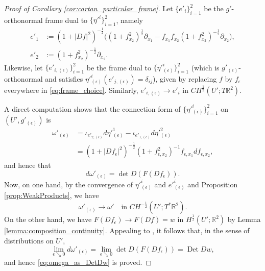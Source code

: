 \documentclass[12pt]{article}
\newcommand{\R}{\mathbb{R}}
\newcommand{\Det}{\operatorname{Det}}
\theoremstyle{plain}
\numberwithin{equation}{section}
\begin{document}
\begin{proof}[{Proof of Corollary \ref{cor:cartan_particular_frame}}]
    Let $\{e'_i\}_{i=1}^2$ be the $g'$-orthonormal frame dual to $\{\eta'^i\}_{i=1}^2$, namely
    \begin{equation} \label{eq:frame_choice}
        \begin{split}
            e'_1 &:= (1+|Df|^2)^{-\frac12}\big( (1+f_{x_2}^2)^\frac12 \partial_{x_1} - f_{x_1}f_{x_2}(1+f_{x_2}^2)^{-\frac12}\partial_{x_2} \big),\\
            e'_2 &:= (1+f_{x_2}^2)^{-\frac12} \partial_{x_2}.
        \end{split}
    \end{equation}
    Likewise, let $\{e'_{i, (\epsilon)}\}_{i=1}^2$ be the frame dual to $\{\eta'^i_{(\epsilon)}\}_{i=1}^2$ (which is $g'_{(\epsilon)}$-orthonormal and satisfies $\eta'^i_{(\epsilon)}(e'_{j,(\epsilon)}) = \delta_{ij}$), given by replacing $f$ by $f_\epsilon$ everywhere in \eqref{eq:frame_choice}. Similarly, $e'_{i,(\epsilon)} \to e'_i$ in $CH^\frac12(U';T\R^2)$.
    
    A direct computation shows that the connection form of $\{\eta'^i_{(\epsilon)}\}_{i=1}^2$ on $(U',g'_{(\epsilon)})$ is
    \begin{align*}
        \omega'_{(\epsilon)} &= \iota_{e'_{2,(\epsilon)}} d\eta'^1_{(\epsilon)} - \iota_{e'_{1,(\epsilon)}} d\eta'^2_{(\epsilon)}\\
        &= (1+|Df_\epsilon|^2)^{-\frac12}(1+f_{\epsilon, x_2}^2)^{-1} f_{\epsilon, x_1} df_{\epsilon, x_2},
    \end{align*}
    and hence that
    \begin{equation*}
        d\omega'_{(\epsilon)} = \det D(F(Df_\epsilon)).
    \end{equation*}
    Now, on one hand, by the convergence of $\eta'^i_{(\epsilon)}$ and $e'^i_{(\epsilon)}$ and Proposition \ref{prop:WeakProducts}, we have
    \begin{equation*}
        \omega'_{(\epsilon)} \to \omega' \quad \text{in } CH^{-\frac12}(U';T^*\R^2).
    \end{equation*}
    On the other hand, we have $F(Df_\epsilon) \to F(Df) = w$ in $H^\frac12(U';\R^2)$ by Lemma \ref{lemma:composition_continuity}. Appealing to \cite[Theorem 3]{brezis_nguyen_11}, it follows that, in the sense of distributions on $U'$,
    \begin{equation*}
        \lim_{\epsilon\searrow 0}d\omega'_{(\epsilon)} = \lim_{\epsilon\searrow 0}\det D(F(Df_\epsilon)) = \Det Dw,
    \end{equation*}
    and hence \eqref{eq:omega_as_DetDw} is proved.
\end{proof}
\end{document}
